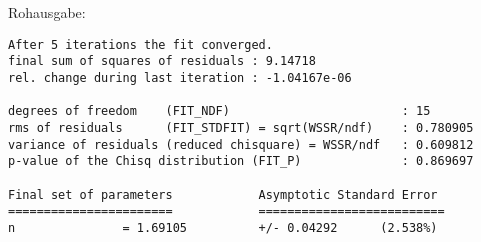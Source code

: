     \vspace{-\baselineskip}
    Rohausgabe:
    \begin{verbatim}
After 5 iterations the fit converged.
final sum of squares of residuals : 9.14718
rel. change during last iteration : -1.04167e-06

degrees of freedom    (FIT_NDF)                        : 15
rms of residuals      (FIT_STDFIT) = sqrt(WSSR/ndf)    : 0.780905
variance of residuals (reduced chisquare) = WSSR/ndf   : 0.609812
p-value of the Chisq distribution (FIT_P)              : 0.869697

Final set of parameters            Asymptotic Standard Error
=======================            ==========================
n               = 1.69105          +/- 0.04292      (2.538%)
    \end{verbatim}